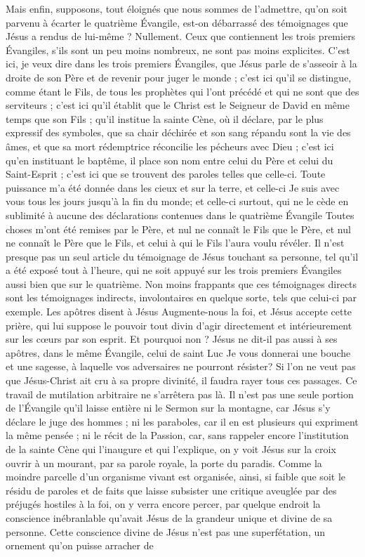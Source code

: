 Mais enfin, supposons, tout éloignés que nous sommes de l’admettre, qu’on soit parvenu à écarter le quatrième Évangile, est-on débarrassé des témoignages que Jésus a rendus de lui-même ? Nullement. Ceux que contiennent les trois premiers Évangiles, s’ils sont un peu moins nombreux, ne sont pas moins explicites. C’est ici, je veux dire dans les trois premiers Évangiles, que Jésus parle de s’asseoir à la droite de son Père et de revenir pour juger le monde ; c’est ici qu’il se distingue, comme étant le Fils, de tous les prophètes qui l’ont précédé et qui ne sont que des serviteurs ; c’est ici qu’il établit que le Christ est le Seigneur de David en même temps que son Fils ; qu’il institue la sainte Cène, où il déclare, par le plus expressif des symboles, que sa chair déchirée et son sang répandu sont la vie des âmes, et que sa mort rédemptrice réconcilie les pécheurs avec Dieu ; c’est ici qu’en instituant le baptême, il place son nom entre celui du Père et celui du Saint-Esprit ; c’est ici que se trouvent des paroles telles que celle-ci.\frcolon{} \Og{} Toute puissance m’a été donnée dans les cieux et sur la terre\Fg{}, et celle-ci\frcolon{} \Og{} Je suis avec vous tous les jours jusqu’à la fin du monde\Fg{}; et celle-ci surtout, qui ne le cède en sublimité à aucune des déclarations contenues dans le quatrième Évangile\frcolon{} \Og{} Toutes choses m’ont été remises par le Père, et nul ne connaît le Fils que le Père, et nul ne connaît le Père que le Fils, et celui à qui le Fils l’aura voulu révéler.\Fg{} Il n’est presque pas un seul article du témoignage de Jésus touchant sa personne, tel qu’il a été exposé tout à l’heure, qui ne soit appuyé sur les trois premiers Évangiles aussi bien que sur le quatrième. Non moins frappants que ces témoignages directs sont les témoignages indirects, involontaires en quelque sorte, tels que celui-ci par exemple. Les apôtres disent à Jésus\frcolon{} \Og{} Augmente-nous la foi\Fg{}, et Jésus accepte cette prière, qui lui suppose le pouvoir tout divin d’agir directement et intérieurement sur les cœurs par son esprit. Et pourquoi non ? Jésus ne dit-il pas aussi à ses apôtres, dans le même Évangile, celui de saint Luc\frcolon{} \Og{} Je vous donnerai une bouche et une sagesse, à laquelle vos adversaires ne pourront résister\Fg{}? Si l’on ne veut pas que Jésus-Christ ait cru à sa propre divinité, il faudra rayer tous ces passages. Ce travail de mutilation arbitraire ne s’arrêtera pas là. Il n’est pas une seule portion de l’Évangile qu’il laisse entière\frcolon{} ni le Sermon sur la montagne, car Jésus s’y déclare le juge des hommes ; ni les paraboles, car il en est plusieurs qui expriment la même pensée ; ni le récit de la Passion, car, sans rappeler encore l’institution de la sainte Cène qui l’inaugure et qui l’explique, on y voit Jésus sur la croix ouvrir à un mourant, par sa parole royale, la porte du paradis. Comme la moindre parcelle d’un organisme vivant est organisée, ainsi, si faible que soit le résidu de paroles et de faits que laisse subsister une critique aveuglée par des préjugés hostiles à la foi, on y verra encore percer, par quelque endroit la conscience inébranlable qu’avait Jésus de la grandeur unique et divine de sa personne. Cette conscience divine de Jésus n’est pas une superfétation, un ornement qu’on puisse arracher de 